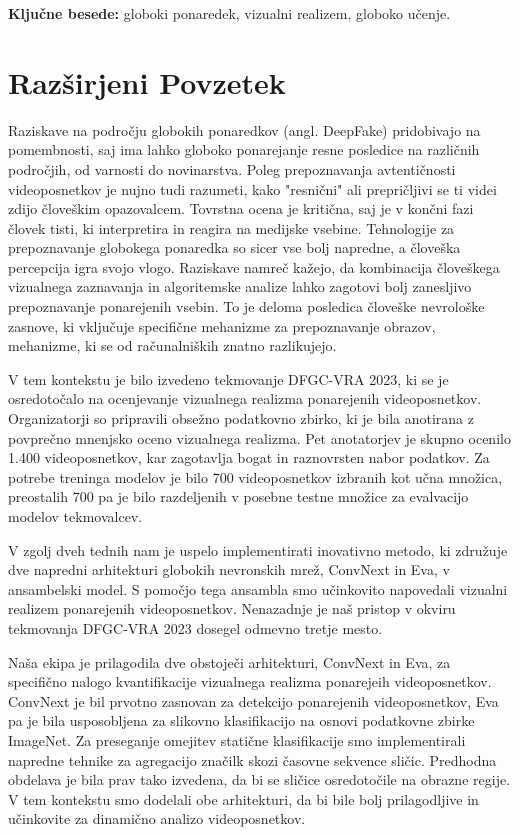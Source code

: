 \documentclass[a4paper,12pt,openright]{book}
\newcommand{\tkeywords}{globoki ponaredek, vizualni realizem, globoko učenje}
\newcommand{\clearemptydoublepage}{\newpage{\pagestyle{empty}\cleardoublepage}}
\begin{document}
\bigskip

\noindent\textbf{Ključne besede:} \tkeywords.
\clearemptydoublepage


{}
\chapter*{Razširjeni Povzetek}
Raziskave na področju globokih ponaredkov (angl. DeepFake) pridobivajo na pomembnosti, saj ima lahko globoko ponarejanje resne posledice na različnih področjih, od varnosti do novinarstva. Poleg prepoznavanja avtentičnosti videoposnetkov je nujno tudi razumeti, kako "resnični" ali prepričljivi se ti videi zdijo človeškim opazovalcem. Tovrstna ocena je kritična, saj je v končni fazi človek tisti, ki interpretira in reagira na medijske vsebine. Tehnologije za prepoznavanje globokega ponaredka so sicer vse bolj napredne, a človeška percepcija igra svojo vlogo. Raziskave namreč kažejo, da kombinacija človeškega vizualnega zaznavanja in algoritemske analize lahko zagotovi bolj zanesljivo prepoznavanje ponarejenih vsebin. To je deloma posledica človeške nevrološke zasnove, ki vključuje specifične mehanizme za prepoznavanje obrazov, mehanizme, ki se od računalniških znatno razlikujejo. 

V tem kontekstu je bilo izvedeno tekmovanje DFGC-VRA 2023, ki se je osredotočalo na ocenjevanje vizualnega realizma ponarejenih videoposnetkov. Organizatorji so pripravili obsežno podatkovno zbirko, ki je bila anotirana z povprečno mnenjsko oceno vizualnega realizma. Pet anotatorjev je skupno ocenilo 1.400 videoposnetkov, kar zagotavlja bogat in raznovrsten nabor podatkov. Za potrebe treninga modelov je bilo 700 videoposnetkov izbranih kot učna množica, preostalih 700 pa je bilo razdeljenih v posebne testne množice za evalvacijo modelov tekmovalcev. 

V zgolj dveh tednih nam je uspelo implementirati inovativno metodo, ki združuje dve napredni arhitekturi globokih nevronskih mrež, ConvNext in Eva, v ansambelski model. S pomočjo tega ansambla smo učinkovito napovedali vizualni realizem ponarejenih videoposnetkov. Nenazadnje je naš pristop v okviru tekmovanja DFGC-VRA 2023 dosegel odmevno tretje mesto.

Naša ekipa je prilagodila dve obstoječi arhitekturi, ConvNext in Eva, za specifično nalogo kvantifikacije vizualnega realizma ponarejeih videoposnetkov. ConvNext je bil prvotno zasnovan za detekcijo ponarejenih videoposnetkov, Eva pa je bila usposobljena za slikovno klasifikacijo na osnovi podatkovne zbirke ImageNet.
Za preseganje omejitev statične klasifikacije smo implementirali napredne tehnike za agregacijo značilk skozi časovne sekvence sličic. Predhodna obdelava je bila prav tako izvedena, da bi se sličice osredotočile na obrazne regije. V tem kontekstu smo dodelali obe arhitekturi, da bi bile bolj prilagodljive in učinkovite za dinamično analizo videoposnetkov.
\end{document}
